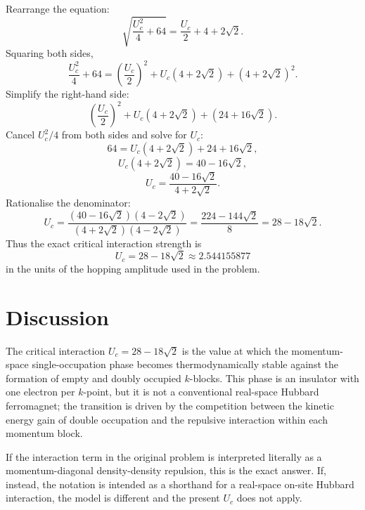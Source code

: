 \documentclass[11pt,a4paper]{article}
\begin{document}
Rearrange the equation:
\[
\sqrt{\frac{U_c^2}{4}+64} = \frac{U_c}{2} + 4 + 2\sqrt2.
\]
Squaring both sides,
\[
\frac{U_c^2}{4}+64 = \left(\frac{U_c}{2}\right)^2 + U_c(4+2\sqrt2) + (4+2\sqrt2)^2.
\]
Simplify the right-hand side:
\[
\left(\frac{U_c}{2}\right)^2 + U_c(4+2\sqrt2) + (24 + 16\sqrt2).
\]
Cancel \(U_c^2/4\) from both sides and solve for \(U_c\):
\[
64 = U_c(4+2\sqrt2) + 24 + 16\sqrt2,
\]
\[
U_c(4+2\sqrt2) = 40 - 16\sqrt2,
\]
\[
U_c = \frac{40-16\sqrt2}{4+2\sqrt2}.
\]
Rationalise the denominator:
\[
U_c = \frac{(40-16\sqrt2)(4-2\sqrt2)}{(4+2\sqrt2)(4-2\sqrt2)}
= \frac{224 - 144\sqrt2}{8}
= 28 - 18\sqrt2.
\]
Thus the exact critical interaction strength is
\begin{equation}
\boxed{
U_c = 28 - 18\sqrt2 \approx 2.544155877
}
\end{equation}
in the units of the hopping amplitude used in the problem.

\section{Discussion}

The critical interaction \(U_c=28-18\sqrt2\) is the value at which the momentum-space single-occupation phase becomes thermodynamically stable against the formation of empty and doubly occupied \(k\)-blocks. This phase is an insulator with one electron per \(k\)-point, but it is not a conventional real-space Hubbard ferromagnet; the transition is driven by the competition between the kinetic energy gain of double occupation and the repulsive interaction within each momentum block.

If the interaction term in the original problem is interpreted literally as a momentum-diagonal density-density repulsion, this is the exact answer. If, instead, the notation is intended as a shorthand for a real-space on-site Hubbard interaction, the model is different and the present \(U_c\) does not apply.
\end{document}
